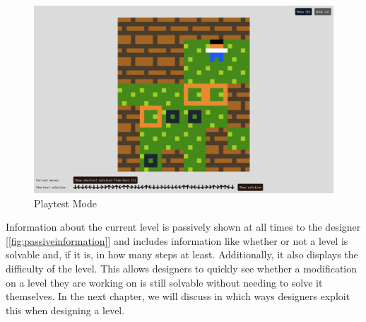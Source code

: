 \begin{figure}
\centering
\includegraphics[width=1.0\linewidth]{figures/playtestmode.png}
\caption[Playtest]{Playtest Mode\label{fig:playtestmode}}
\end{figure}

Information about the current level is passively shown at all times to the designer [\ref{fig:passiveinformation}] and includes information like whether or not a level is solvable and, if it is, in how many steps at least. Additionally, it also displays the difficulty of the level.
This allows designers to quickly see whether a modification on a level they are working on is still solvable without needing to solve it themselves. In the next chapter, we will discuss in which ways designers exploit this when designing a level.


